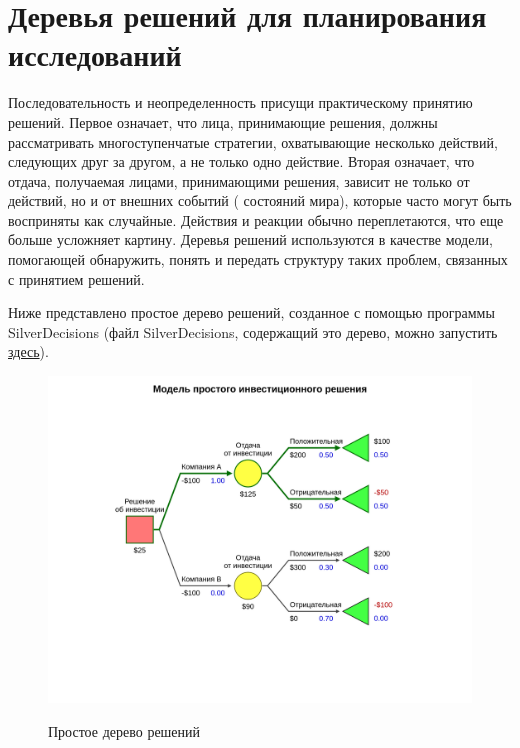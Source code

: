 \section{Деревья решений для планирования исследований}

Последовательность и неопределенность присущи практическому принятию решений. Первое означает, что лица, принимающие решения, должны рассматривать многоступенчатые стратегии, охватывающие несколько действий, следующих друг за другом, а не только одно действие. Вторая означает, что отдача, получаемая лицами, принимающими решения, зависит не только от действий, но и от внешних событий ( состояний мира), которые часто могут быть восприняты как случайные. Действия и реакции обычно переплетаются, что еще больше усложняет картину. Деревья решений используются в качестве модели, помогающей обнаружить, понять и передать структуру таких проблем, связанных с принятием решений.

Ниже представлено простое дерево решений, созданное с помощью программы SilverDecisions (файл SilverDecisions, содержащий это дерево, можно запустить \href{http://silverdecisions.pl/SilverDecisions.html?LOAD_SD_TREE_JSON=https://raw.githubusercontent.com/gubkin-rienm/isp/master/data/decision_tree/simple_invest_decision.json}{здесь}).

\begin{figure}[h!]
	\includegraphics[width= 15cm]{pics/simple_decision_tree_1.png} 
	\label{fig:sample}
	\caption{Простое дерево решений}
\end{figure}

